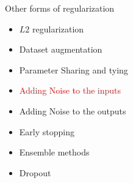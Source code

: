 \begin{frame}
\end{frame}

\begin{frame}
	\vspace{4em}
	\begin{overlayarea}{\textwidth}{\textheight}
		\begin{block}{Other forms of regularization}
			\begin{itemize}
				\item $L2$ regularization
				\item Dataset augmentation
				\item Parameter Sharing and tying
				\item \textcolor<2->{red}{Adding Noise to the inputs }
				\item Adding Noise to the outputs 
				\item Early stopping
				\item Ensemble methods
				\item Dropout
			\end{itemize}
		\end{block}
	\end{overlayarea}
\end{frame}
			


